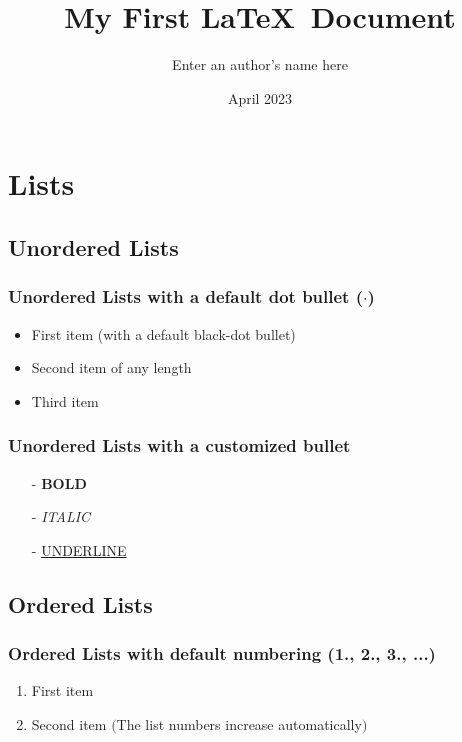 \documentclass[11pt, a4paper]{article}
\title{My First \LaTeX\ Document}
\author{Enter an author’s name here} %
\date{April 2023}
\begin{document}
	\maketitle
	\setcounter{section}{1} %
	\section{Lists}
	\subsection{Unordered Lists}
	\subsubsection{Unordered Lists with a default dot bullet ($\cdot$) }
	\begin{itemize}  
		\item First item (with a default black-dot bullet) 
		\item Second item of any length
		\item Third item
	\end{itemize}

	\subsubsection{Unordered Lists with a customized bullet}
	\begin{itemize}	%
		\item[-]\textbf{BOLD}
		\item[-]\textit{ITALIC}
		\item[-]\underline{UNDERLINE}
	\end{itemize}
	
	\subsection{Ordered Lists}
	\subsubsection{Ordered Lists with default numbering (1., 2., 3., ...)}
	\begin{enumerate}
		\item First item
		\item Second item $($The list numbers increase automatically$)$
	\end{enumerate}
\end{document}
